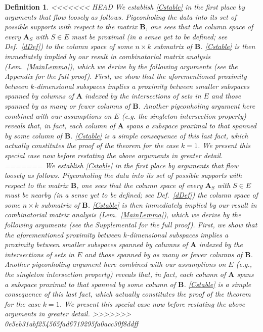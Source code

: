 \documentclass[9pt,twocolumn]{pnas-new}
\newtheorem{definition}{Definition}
\begin{document}
\begin{definition}
<<<<<<< HEAD
We establish \eqref{Cstable} in the first place by arguments that flow loosely as follows. Pigeonholing the data into its set of possible supports with respect to the matrix $\mathbf{B}$, one sees that the column space of every $\mathbf{A}_S$ with $S \in E$ must be proximal (in a sense yet to be defined; see Def.~\ref{dDef}) to the column space of some $n \times k$ submatrix of $\mathbf{B}$. \eqref{Cstable} is then immediately implied by our result in combinatorial matrix analysis (Lem.~\ref{MainLemma}), which we derive by the following arguments (see the Appendix for the full proof). First, we show that the aforementioned proximity between $k$-dimensional subspaces implies a proximity between smaller subspaces spanned by columns of $\mathbf{A}$ indexed by the intersections of sets in $E$ and those spanned by as many or fewer columns of $\mathbf{B}$. Another pigeonholing argument here combined with our assumptions on $E$ (e.g. the singleton intersection property) reveals that, in fact, each column of $\mathbf{A}$ spans a subspace proximal to that spanned by some column of $\mathbf{B}$. \eqref{Cstable} is a simple consequence of this last fact, which actually constitutes the proof of the theorem for the case $k=1$. We present this special case now before restating the above arguments in greater detail.
=======
We establish \eqref{Cstable} in the first place by arguments that flow loosely as follows. Pigeonholing the data into its set of possible supports with respect to the matrix $\mathbf{B}$, one sees that the column space of every $\mathbf{A}_S$ with $S \in E$ must be nearby (in a sense yet to be defined; see Def.~\ref{dDef}) the column space of some $n \times k$ submatrix of $\mathbf{B}$. \eqref{Cstable} is then immediately implied by our result in combinatorial matrix analysis (Lem.~\ref{MainLemma}), which we derive by the following arguments (see the Supplemental for the full proof). First, we show that the aforementioned proximity between $k$-dimensional subspaces implies a proximity between smaller subspaces spanned by columns of $\mathbf{A}$ indexed by the intersections of sets in $E$ and those spanned by as many or fewer columns of $\mathbf{B}$. Another pigeonholing argument here combined with our assumptions on $E$ (e.g., the singleton intersection property) reveals that, in fact, each column of $\mathbf{A}$ spans a subspace proximal to that spanned by some column of $\mathbf{B}$. \eqref{Cstable} is a simple consequence of this last fact, which actually constitutes the proof of the theorem for the case $k=1$. We present this special case now before restating the above arguments in greater detail.
>>>>>>> 0e5eb31abf254565fad6719295fa0acc30f8ddff


\end{definition}
\end{document}
